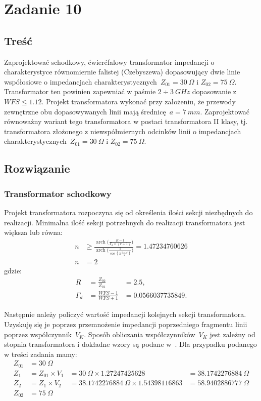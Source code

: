 \documentclass[rep.tex]{subfiles}
\begin{document}
\chapter{Zadanie 10}
\label{zad10}
\section{Treść}
Zaprojektować schodkowy, ćwierćfalowy transformator impedancji o charakterystyce
równomiernie falistej (Czebyszewa) dopasowujący dwie linie współosiowe o impedancjach
charakterystycznych~$Z_{01} = 30~\Omega$ i $Z_{02} = 75~\Omega$.
Transformator ten powinien zapewniać w paśmie $2 \div 3~GHz$ dopasowanie z $WFS \le 1.12$.
Projekt transformatora wykonać przy założeniu,
że przewody zewnętrzne obu dopasowywanych linii mają średnicę~$a = 7~mm$.
Zaprojektować równoważny wariant tego transformatora w postaci transformatora II klasy,
tj. transformatora złożonego z niewspółmiernych odcinków linii o impedancjach
charakterystycznych~$Z_{01} = 30~\Omega$ i $Z_{02} = 75~\Omega$.

\section{Rozwiązanie}
\subsection{Transformator schodkowy}
\label{zad10:step}
Projekt transformatora rozpoczyna się od określenia ilości sekcji niezbędnych do realizacji.
Minimalna ilość sekcji potrzebnych do realizacji transformatora jest większa lub równa:
\begin{align}
  n &\ge \frac{\operatorname{arch}\Big(\frac{R - 1}{\Gamma_d \times (r + 1)}\Big)}{\operatorname{arch}\Big(\frac{1}{\cos(\pi \frac{1 - \omega}{2})}\Big)} = 1.47234760626 \\
  n &= 2 \nonumber
\end{align}
gdzie:\\
\begin{align}
  R &= \frac{Z_{02}}{Z_{01}} &= 2.5, \nonumber \\
  \Gamma_d &= \frac{WFS - 1}{WFS + 1} &= 0.0566037735849. \nonumber
\end{align}

Następnie należy policzyć wartość impedancji kolejnych sekcji transformatora.
Uzyskuję się je poprzez przemnożenie impedancji poprzedniego fragmentu linii poprzez współczynnik~$V_K$.
Sposób obliczania współczynników~$V_K$ jest zależny od stopnia transformatora i dokładne wzory są podane w~\cite{obwody}.
Dla przypadku podanego w treści zadania mamy:
\begin{align}
  Z_{01} &= 30~\Omega \nonumber \\
  Z_{1~} &= Z_{01} \times V_1 &= 30~\Omega \times 1.27247425628 &= 38.1742276884~\Omega \nonumber \\
  Z_{2~} &= Z_1 \times V_2 &= 38.1742276884~\Omega \times 1.54398116863 &= 58.9402886777~\Omega \nonumber \\
  Z_{02} &= 75~\Omega \nonumber
\end{align}
\end{document}
